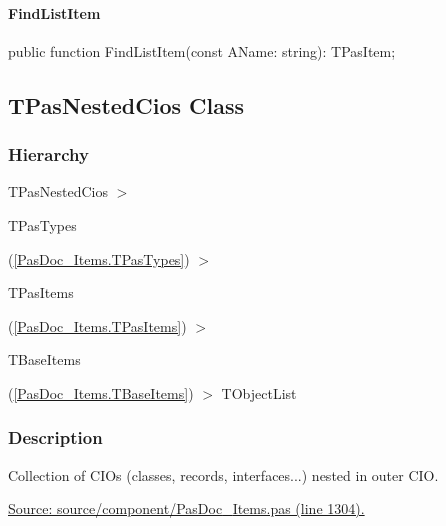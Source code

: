 \documentclass{report}
\newif\ifpdf
\begin{document}
\paragraph*{FindListItem}\hspace*{\fill}

\label{PasDoc_Items.TPasTypes-FindListItem}
\begin{list}{}{
\setlength{\itemindent}{0cm}
\setlength{\listparindent}{0cm}
\setlength{\leftmargin}{\evensidemargin}
\addtolength{\leftmargin}{\tmplength}
\settowidth{\labelsep}{X}
\addtolength{\leftmargin}{\labelsep}
\setlength{\labelwidth}{\tmplength}
}
\item[\textbf{Declaration}\hfill]
\ifpdf
\begin{flushleft}
\fi
\begin{ttfamily}
public function FindListItem(const AName: string): TPasItem;\end{ttfamily}

\ifpdf
\end{flushleft}
\fi

\end{list}
\ifpdf
\subsection*{\large{\textbf{TPasNestedCios Class}}\normalsize\hspace{1ex}\hrulefill}
\else
\subsection*{TPasNestedCios Class}
\fi
\label{PasDoc_Items.TPasNestedCios}
\subsubsection*{\large{\textbf{Hierarchy}}\normalsize\hspace{1ex}\hfill}
TPasNestedCios {$>$} \begin{ttfamily}TPasTypes\end{ttfamily}(\ref{PasDoc_Items.TPasTypes}) {$>$} \begin{ttfamily}TPasItems\end{ttfamily}(\ref{PasDoc_Items.TPasItems}) {$>$} \begin{ttfamily}TBaseItems\end{ttfamily}(\ref{PasDoc_Items.TBaseItems}) {$>$} 
TObjectList
\subsubsection*{\large{\textbf{Description}}\normalsize\hspace{1ex}\hfill}
Collection of CIOs (classes, records, interfaces...) nested in outer CIO.\par
\href{https://github.com/pasdoc/pasdoc/blob/master/source/component/PasDoc_Items.pas#L1304}{Source: source/component/PasDoc{\_}Items.pas (line 1304).}\ifpdf
\end{document}
